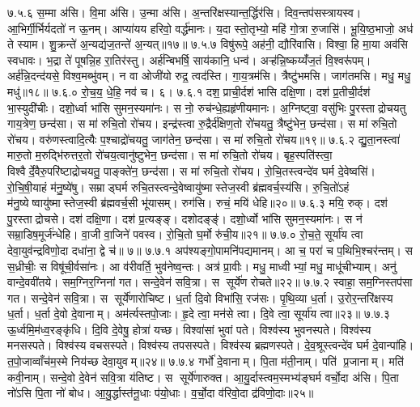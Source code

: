 ७.५.६
स॒म्मा अ॑सि। वि॒मा अ॑सि। उ॒न्मा अ॑सि। अ॒न्तरि॑क्षस्यान्त॒र्द्धिर॑सि। दिव॒न्तप॑सस्त्रायस्व। आ॒भिर्गी॒र्भिर्यदतो॑ न ऊ॒नम्। आप्या॑यय हरिवो॒ वर्द्ध॑मानः। य॒दा स्तो॒तृभ्यो॒ महि॑ गो॒त्रा रु॒जासि॑। भू॒यि॒ष्ठ॒भाजो॒ अध॑ ते स्याम। शु॒क्रन्ते॑ अ॒न्यद्य॑ज॒तन्ते॑ अ॒न्यत्॥१७॥
७.५.७
विषु॑रूपे॒ अह॑नी॒ द्यौरि॑वासि। विश्वा॒ हि मा॒या अव॑सि स्वधावः। भ॒द्रा ते॑ पूषन्नि॒ह रा॒तिर॑स्तु। अर्\mbox{}ह॑न्बिभर्\mbox{}षि॒ साय॑कानि॒ धन्व॑। अऱ्ह॑न्नि॒ष्कय्यँ॑ज॒तं  वि॒श्वरू॑पम्। अर्\mbox{}ह॑न्नि॒दन्द॑यसे॒ विश्व॒मब्भु॑वम्। न वा ओजी॑यो रुद्र॒ त्वद॑स्ति। गा॒य॒त्रम॑सि। त्रैष्टु॑भमसि। जाग॑तमसि। मधु॒ मधु॒ मधु॑॥१८॥
७.६.०
रो॒च॒य॒ धे॒हि॒ नव॑ च। ६।
\anuvakamend
७.६.१
दश॒ प्राची॒र्दश॑ भासि दक्षि॒णा। दश॑ प्र॒तीची॒र्दश॑ भा॒स्युदी॑चीः। दशो॒र्ध्वा भा॑सि सुमन॒स्यमा॑नः। स नो॒ रुच॑न्धे॒ह्यहृ॑णीयमानः। अ॒ग्निष्ट्वा॒ वसु॑भिः पु॒रस्ताद्रोचयतु गाय॒त्रेण॒ छन्द॑सा। स मा॑ रुचि॒तो रो॑चय। इन्द्र॑स्त्वा रु॒द्रैर्द॑क्षिण॒तो रो॑चयतु॒ त्रैष्टु॑भेन॒ छन्द॑सा। स मा॑ रुचि॒तो रो॑चय। वरु॑णस्त्वादि॒त्यैः प॒श्चाद्रो॑चयतु॒ जाग॑तेन॒ छन्द॑सा। स मा॑ रुचि॒तो रो॑चय॥१९॥
७.६.२
द्यु॒ता॒नस्त्वा॑ मारु॒तो म॒रुद्भि॑रुत्तर॒तो रो॑चय॒त्वानु॑ष्टुभेन॒ छन्द॑सा। स मा॑ रुचि॒तो रो॑चय। बृह॒स्पति॑स्त्वा॒ विश्वैर्दे॒वैरु॒परि॑ष्टाद्रोचयतु॒ पाङ्क्ते॑न॒ छन्द॑सा। स मा॑ रुचि॒तो रो॑चय। रो॒चि॒तस्त्वन्दे॑व घर्म दे॒वेष्वसि॑। रो॒चि॒षी॒याहं म॑नु॒ष्ये॑षु। सम्राड्घर्म रुचि॒तस्त्वन्दे॒वेष्वायु॑ष्मास्तेज॒स्वी ब्र॑ह्मवर्च॒स्य॑सि। रु॒चि॒तो॑ऽहं म॑नु॒ष्येष्वायु॑ष्मास्तेज॒स्वी ब्र॑ह्मवर्च॒सी भू॑यासम्। रुग॑सि। रुचं॒ मयि॑ धेहि॥२०॥
७.६.३
मयि॒ रुक्। दश॑ पु॒रस्ताद्रोचसे। दश॑ दक्षि॒णा। दश॑ प्र॒त्यङ्ङ्। दशोदङ्ङ्॑। दशो॒र्ध्वो भा॑सि सुमन॒स्यमा॑नः। स न॑ सम्रा॒डिष॒मूर्ज॑न्धेहि। वा॒जी वा॒जिने॑ पवस्व। रो॒चि॒तो घ॒र्मो रु॑ची॒य॥२१॥
७.७.०
रो॒च॒ते॒ सूर्या॑य त्वा देवा॒युव॑न्द्रविणो॒दा दधा॑ना॒ द्वे च॑॥ ७॥
\anuvakamend
७.७.१
अप॑श्यङ्गो॒पामनि॑पद्यमानम्। आ च॒ परा॑ च प॒थिभि॒श्चर॑न्तम्। स स॒ध्रीचीः॒ स विषू॑ची॒र्वसा॑नः। आ व॑रीवर्ति॒ भुव॑नेष्व॒न्तः। अत्र॑ प्रा॒वीः। मधु॒ माध्वीभ्यां॒ मधु॒ माधू॑चीभ्याम्। अनु॑ वान्दे॒ववी॑तये। सम॒ग्निर॒ग्निना॑ गत। सन्दे॒वेन॑ सवि॒त्रा। स सूर्ये॑ण रोचते॥२२॥
७.७.२
स्वाहा॒ सम॒ग्निस्तप॑सा गत। सन्दे॒वेन॑ सवि॒त्रा। स सूर्ये॑णारोचिष्ट। ध॒र्ता दि॒वो विभा॑सि॒ रज॑सः। पृ॒थि॒व्या ध॒र्ता। उ॒रोर॒न्तरि॑क्षस्य ध॒र्ता। ध॒र्ता दे॒वो दे॒वानाम्। अम॑र्त्यस्तपो॒जाः। हृ॒दे त्वा॒ मन॑से त्वा। दि॒वे त्वा॒ सूर्या॑य त्वा॥२३॥
७.७.३
ऊ॒र्ध्वमि॒म॑ध्व॒रङ्कृ॑धि। दि॒वि दे॒वेषु॒ होत्रा॑ यच्छ। विश्वा॑सां भुवां पते। विश्व॑स्य भुवनस्पते। विश्व॑स्य मनसस्पते। विश्व॑स्य वचसस्पते। विश्व॑स्य तपसस्पते। विश्व॑स्य ब्रह्मणस्पते। दे॒व॒श्रूस्त्वन्दे॑व घर्म दे॒वान्पा॑हि। त॒पो॒जाव्वाँच॑म॒स्मे निय॑च्छ देवा॒युवम्॥२४॥
७.७.४
गर्भो॑ दे॒वानाम्। पि॒ता म॑ती॒नाम्। पति॑ प्र॒जानाम्। मति॑ कवी॒नाम्। सन्दे॒वो दे॒वेन॑ सवि॒त्रा य॑तिष्ट। स सूर्ये॑णारुक्त। आ॒यु॒र्दास्त्वम॒स्मभ्य॑ङ्घर्म वर्चो॒दा अ॑सि। पि॒ता नो॑ऽसि पि॒ता नो॑ बोध। आ॒यु॒र्द्धास्त॑नू॒धाः प॑यो॒धाः। व॒र्चो॒दा व॑रिवो॒दा द्र॑विणो॒दाः॥२५॥

